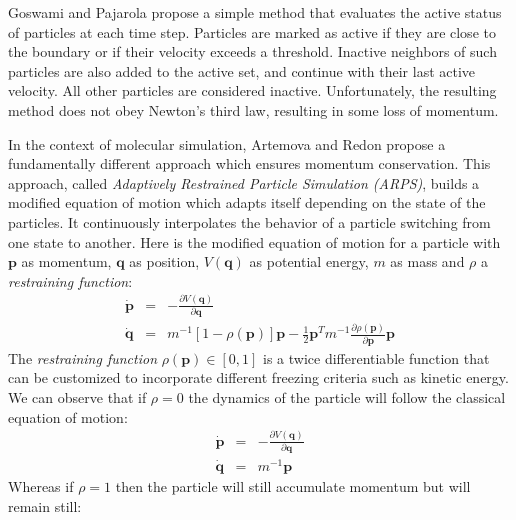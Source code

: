 Goswami and Pajarola \cite{Goswami2011} propose a simple method that evaluates the active status of particles at each time step.
Particles are marked as active if they are close to the boundary or if their velocity exceeds a threshold.
Inactive neighbors of such particles are also added to the active set, and continue with their last active velocity.
All other particles are considered inactive.
Unfortunately, the resulting method does not obey Newton's third law, resulting in some loss of momentum.

In the context of molecular simulation, Artemova and Redon \cite{Artemova2012} propose a fundamentally different approach which ensures momentum conservation.
This approach, called \emph{Adaptively Restrained Particle Simulation (ARPS)}, builds a modified equation of motion which adapts itself depending on the state of the particles. It continuously interpolates the behavior of a particle switching from one state to another. Here is the modified equation of motion for a particle with $\mathbf{p}$ as momentum, $\mathbf{q}$ as position, $V(\mathbf{q})$ as potential energy, $m$ as mass and $\rho$ a \emph{restraining function}:
\begin{equation}
    \label{eq:arps_hamiltonian}
    \begin{array}{lll}
        \displaystyle \dot{\mathbf{p}} & = & \displaystyle - \frac{\partial V(\mathbf{q})}{\partial \mathbf{q}} \\
        \displaystyle \dot{\mathbf{q}} & = & \displaystyle m^{-1}\left[1 - \rho(\mathbf{p})\right]\mathbf{p} - \frac{1}{2} \mathbf{p}^{T}m^{-1}\frac{\partial \rho(\mathbf{p})}{\partial \mathbf{p}}\mathbf{p}
\end{array}
\end{equation}
The \emph{restraining function} $\rho(\mathbf{p}) \in \left[0,1\right]$ is a twice differentiable function that can be customized to incorporate different freezing criteria such as kinetic energy.
We can observe that if $\rho=0$ the dynamics of the particle will follow the classical equation of motion:
\begin{equation}
\label{eq:classical_motion}
\begin{array}{lll}
    \displaystyle \dot{\mathbf{p}} & = & \displaystyle - \frac{\partial V(\mathbf{q})}{\partial \mathbf{q}} \\
    \displaystyle \dot{\mathbf{q}} & = & \displaystyle m^{-1}\mathbf{p}
\end{array}
\end{equation}
Whereas if $\rho=1$ then the particle will still accumulate momentum but will remain still:

